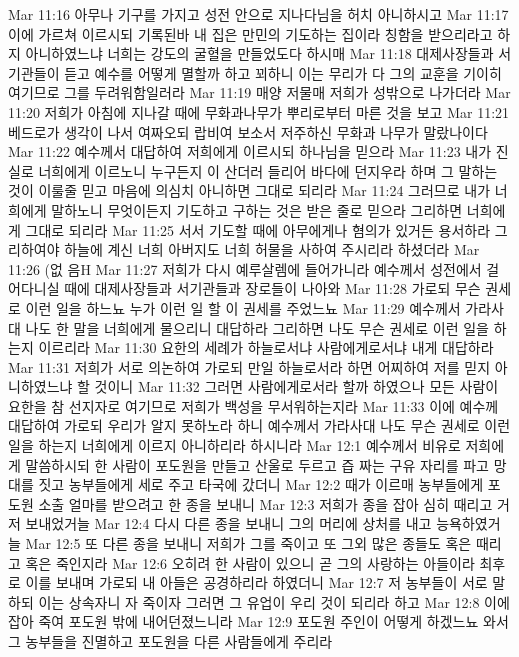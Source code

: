 Mar 11:16  아무나 기구를 가지고 성전 안으로 지나다님을 허치 아니하시고
Mar 11:17  이에 가르쳐 이르시되 기록된바 내 집은 만민의 기도하는 집이라 칭함을 받으리라고 하지 아니하였느냐 너희는 강도의 굴혈을 만들었도다 하시매
Mar 11:18  대제사장들과 서기관들이 듣고 예수를 어떻게 멸할까 하고 꾀하니 이는 무리가 다 그의 교훈을 기이히 여기므로 그를 두려워함일러라
Mar 11:19  매양 저물매 저희가 성밖으로 나가더라
Mar 11:20  저희가 아침에 지나갈 때에 무화과나무가 뿌리로부터 마른 것을 보고
Mar 11:21  베드로가 생각이 나서 여짜오되 랍비여 보소서 저주하신 무화과 나무가 말랐나이다
Mar 11:22  예수께서 대답하여 저희에게 이르시되 하나님을 믿으라
Mar 11:23  내가 진실로 너희에게 이르노니 누구든지 이 산더러 들리어 바다에 던지우라 하며 그 말하는 것이 이룰줄 믿고 마음에 의심치 아니하면 그대로 되리라
Mar 11:24  그러므로 내가 너희에게 말하노니 무엇이든지 기도하고 구하는 것은 받은 줄로 믿으라 그리하면 너희에게 그대로 되리라
Mar 11:25  서서 기도할 때에 아무에게나 혐의가 있거든 용서하라 그리하여야 하늘에 계신 너희 아버지도 너희 허물을 사하여 주시리라 하셨더라
Mar 11:26  (없 음H
Mar 11:27  저희가 다시 예루살렘에 들어가니라 예수께서 성전에서 걸어다니실 때에 대제사장들과 서기관들과 장로들이 나아와
Mar 11:28  가로되 무슨 권세로 이런 일을 하느뇨 누가 이런 일 할 이 권세를 주었느뇨
Mar 11:29  예수께서 가라사대 나도 한 말을 너희에게 물으리니 대답하라 그리하면 나도 무슨 권세로 이런 일을 하는지 이르리라
Mar 11:30  요한의 세례가 하늘로서냐 사람에게로서냐 내게 대답하라
Mar 11:31  저희가 서로 의논하여 가로되 만일 하늘로서라 하면 어찌하여 저를 믿지 아니하였느냐 할 것이니
Mar 11:32  그러면 사람에게로서라 할까 하였으나 모든 사람이 요한을 참 선지자로 여기므로 저희가 백성을 무서워하는지라
Mar 11:33  이에 예수께 대답하여 가로되 우리가 알지 못하노라 하니 예수께서 가라사대 나도 무슨 권세로 이런 일을 하는지 너희에게 이르지 아니하리라 하시니라
Mar 12:1  예수께서 비유로 저희에게 말씀하시되 한 사람이 포도원을 만들고 산울로 두르고 즙 짜는 구유 자리를 파고 망대를 짓고 농부들에게 세로 주고 타국에 갔더니
Mar 12:2  때가 이르매 농부들에게 포도원 소출 얼마를 받으려고 한 종을 보내니
Mar 12:3  저희가 종을 잡아 심히 때리고 거저 보내었거늘
Mar 12:4  다시 다른 종을 보내니 그의 머리에 상처를 내고 능욕하였거늘
Mar 12:5  또 다른 종을 보내니 저희가 그를 죽이고 또 그외 많은 종들도 혹은 때리고 혹은 죽인지라
Mar 12:6  오히려 한 사람이 있으니 곧 그의 사랑하는 아들이라 최후로 이를 보내며 가로되 내 아들은 공경하리라 하였더니
Mar 12:7  저 농부들이 서로 말하되 이는 상속자니 자 죽이자 그러면 그 유업이 우리 것이 되리라 하고
Mar 12:8  이에 잡아 죽여 포도원 밖에 내어던졌느니라
Mar 12:9  포도원 주인이 어떻게 하겠느뇨 와서 그 농부들을 진멸하고 포도원을 다른 사람들에게 주리라
